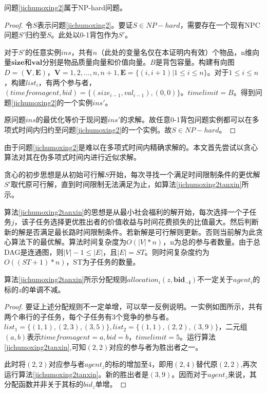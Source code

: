 \documentclass[promaster]{thesis-uestc}
\begin{document}
\begin{theorem}
   问题\ref{jichumoxing2}属于NP-hard问题。
\end{theorem}

\begin{proof}
    令$S$表示问题\ref{jichumoxing2}。要证$S\in NP-hard$，需要存在一个现有NPC问题$S'$归约至$S$。此处以0-1背包作为$S'$。

    对于$S'$的任意实例$ins$，共有$n$（此处的变量名仅在本证明内有效）个物品，n维向量$\mathbf{size}$和$\mathbf{val}$分别是物品质量向量和价值向量。$B$是背包容量。构建有向图$D=(\mathbf{V},\mathbf{E})$，$\mathbf{V} = {1,2,...,n,n+1},\mathbf{E} = \{(i,i+1)|1 \leq i \leq n\}$。对于$1 \leq i \leq n$，构建$list_i$，有两个参与者，$(timefromagent,bid) = \{(size_{i-1},val_{i-1}),(0,0)\}$。$timelimit = B$。得到问题\ref{jichumoxing2}的一个实例$ins'$。

    原问题$ins$的最优化等价于现问题$ins'$的求解。故任意0-1背包问题实例都可以在多项式时间内归约至问题\ref{jichumoxing2}的一个实例。故$S\in NP-hard$。
\end{proof}

由于问题\ref{jichumoxing2}是难以在多项式时间内精确求解的。本文首先尝试以贪心算法对其在伪多项式时间内进行近似求解。

贪心的初步思想是从初始可行解$S$开始，每次寻找一个满足时间限制条件的更优解$S'$取代原可行解，直到时间限制无法满足为止，如算法\ref{jichumoxing2tanxin}所示。

算法\ref{jichumoxing2tanxin}的思想是从最小社会福利的解开始，每次选择一个子任务$j$，该子任务选择更优胜出者的价值收益与时间花费损失的比值最大。然后判断新的解是否满足最长路时间限制条件。若新解是可行解则更新。否则当前解为此贪心算法下的最优解。算法时间复杂度为$O(|V|*n)$，n为总的参与者数量。由于总DAG是连通图，则$|V|- 1\leq |E|$，且$|E| = ST$。则时间复杂度约为$O((ST+1)*n)$，ST为子任务的数量。

\begin{theorem}
    算法\ref{jichumoxing2tanxin}所示分配规则$allocation_i(z,\mathbf{bid_{-i}})$不一定关于$agent_i$的标的$z$的单调不减。
\end{theorem}

\begin{proof}
    要证上述分配规则不一定单增，可以举一反例说明。一实例如图所示，共有两个串行的子任务，每个子任务有$3$个竞争的参与者。$list_1=\{(1,1),(2,3),(3,5)\},list_2=\{(1,1),(2,2),(3,9)\}$，二元组$(a,b)$表示$timefromagent=a,bid=b$，$timelimit=5$。运行算法\ref{jichumoxing2tanxin},可知$(2,2)$对应的参与者为胜出者之一。

    此时将$(2,2)$对应参与者$agent_z$的标的增加至$4$，即用$(2,4)$替代原$(2,2)$,再次运行算法\ref{jichumoxing2tanxin}。新的胜出者是$(3,9)$。因而对于$agent_z$来说，其分配函数并非关于其标的$bid_z$单增。
\end{proof}
\end{document}
